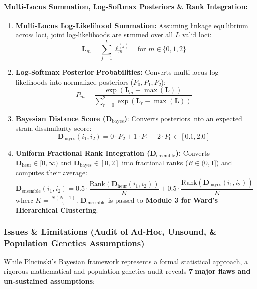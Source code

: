 \documentclass[11pt,a4paper]{article}
\begin{document}
\paragraph{Multi-Locus Summation, Log-Softmax Posteriors \& Rank Integration:}
\begin{enumerate}[leftmargin=*]
    \item \textbf{Multi-Locus Log-Likelihood Summation:} Assuming linkage equilibrium across loci, joint log-likelihoods are summed over all $L$ valid loci:
    \begin{equation}
    \mathbf{L}_m = \sum_{j=1}^L \ell_m^{(j)} \quad \text{for } m \in \{0, 1, 2\}
    \end{equation}
    \item \textbf{Log-Softmax Posterior Probabilities:} Converts multi-locus log-likelihoods into normalized posteriors ($P_0, P_1, P_2$):
    \begin{equation}
    P_m = \frac{\exp(\mathbf{L}_m - \max(\mathbf{L}))}{\sum_{r=0}^2 \exp(\mathbf{L}_r - \max(\mathbf{L}))}
    \end{equation}
    \item \textbf{Bayesian Distance Score ($\mathbf{D}_{\text{bayes}}$):} Converts posteriors into an expected strain dissimilarity score:
    \begin{equation}
    \mathbf{D}_{\text{bayes}}(i_1, i_2) = 0 \cdot P_2 + 1 \cdot P_1 + 2 \cdot P_0 \in [0.0, 2.0]
    \end{equation}
    \item \textbf{Uniform Fractional Rank Integration ($\mathbf{D}_{\text{ensemble}}$):} Converts $\mathbf{D}_{\text{heur}} \in [0, \infty)$ and $\mathbf{D}_{\text{bayes}} \in [0, 2]$ into fractional ranks ($R \in (0, 1]$) and computes their average:
    \begin{equation}
    \mathbf{D}_{\text{ensemble}}(i_1, i_2) = 0.5 \cdot \frac{\text{Rank}(\mathbf{D}_{\text{heur}}(i_1, i_2))}{K} + 0.5 \cdot \frac{\text{Rank}(\mathbf{D}_{\text{bayes}}(i_1, i_2))}{K}
    \end{equation}
    where $K = \frac{N(N-1)}{2}$. $\mathbf{D}_{\text{ensemble}}$ is passed to \textbf{Module 3 for Ward's Hierarchical Clustering}.
\end{enumerate}

\subsubsection{Issues \& Limitations (Audit of Ad-Hoc, Unsound, \& Population Genetics Assumptions)}
While Plucinski's Bayesian framework represents a formal statistical approach, a rigorous mathematical and population genetics audit reveals \textbf{7 major flaws and un-sustained assumptions}:
\end{document}
